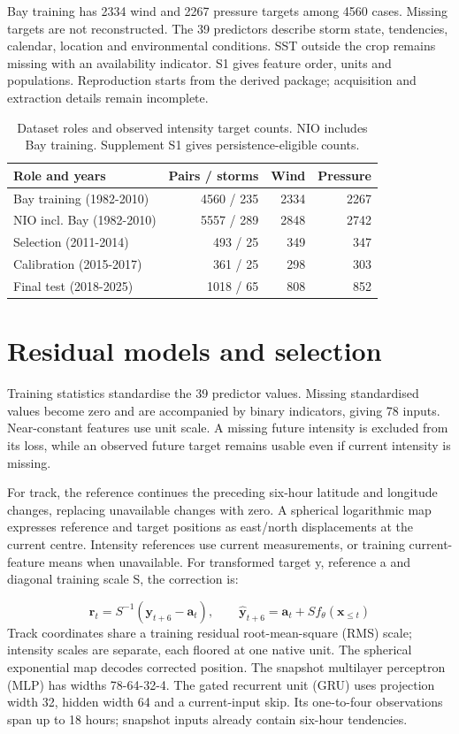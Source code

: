 \documentclass[pdflatex,sn-mathphys-num,referee,a4paper]{sn-jnl}
\begin{document}
Bay training has 2334 wind and 2267 pressure targets among 4560 cases. Missing targets are not reconstructed. The 39 predictors describe storm state, tendencies, calendar, location and environmental conditions. SST outside the crop remains missing with an availability indicator. S1 gives feature order, units and populations. Reproduction starts from the derived package; acquisition and extraction details remain incomplete.


\begin{table}[htbp]
\caption{Dataset roles and observed intensity target counts. NIO includes Bay training. Supplement S1 gives persistence-eligible counts.}\label{tab:data}
\centering
\begin{tabular}{p{43mm}rrr}
\toprule
Role and years & Pairs / storms & Wind & Pressure \\
\midrule
Bay training (1982-2010) & 4560 / 235 & 2334 & 2267 \\
NIO incl. Bay (1982-2010) & 5557 / 289 & 2848 & 2742 \\
Selection (2011-2014) & 493 / 25 & 349 & 347 \\
Calibration (2015-2017) & 361 / 25 & 298 & 303 \\
Final test (2018-2025) & 1018 / 65 & 808 & 852 \\
\bottomrule
\end{tabular}
\end{table}

\section{Residual models and selection}
Training statistics standardise the 39 predictor values. Missing standardised values become zero and are accompanied by binary indicators, giving 78 inputs. Near-constant features use unit scale. A missing future intensity is excluded from its loss, while an observed future target remains usable even if current intensity is missing.

For track, the reference continues the preceding six-hour latitude and longitude changes, replacing unavailable changes with zero. A spherical logarithmic map expresses reference and target positions as east/north displacements at the current centre. Intensity references use current measurements, or training current-feature means when unavailable. For transformed target y, reference a and diagonal training scale S, the correction is:

\begin{equation}
\mathbf{r}_t=S^{-1}(\mathbf{y}_{t+6}-\mathbf{a}_t),\qquad \widehat{\mathbf{y}}_{t+6}=\mathbf{a}_t+S f_{\theta}(\mathbf{x}_{\leq t})
\end{equation}
Track coordinates share a training residual root-mean-square (RMS) scale; intensity scales are separate, each floored at one native unit. The spherical exponential map decodes corrected position. The snapshot multilayer perceptron (MLP) has widths 78-64-32-4. The gated recurrent unit (GRU) uses projection width 32, hidden width 64 and a current-input skip. Its one-to-four observations span up to 18 hours; snapshot inputs already contain six-hour tendencies.
\end{document}
